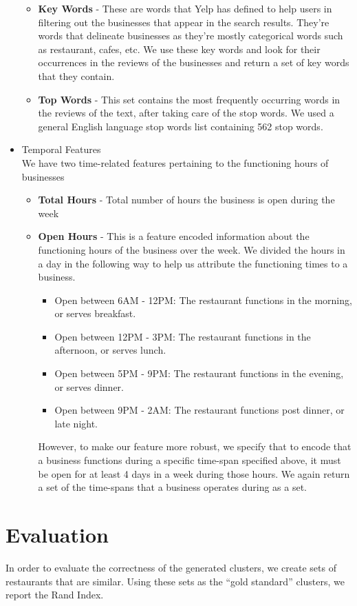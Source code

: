 \documentclass{article}
\begin{document}
\begin{itemize}
\begin{itemize}
            \item \textbf{Key Words} - These are words that Yelp has defined to help users in filtering out the businesses that appear in the search results. They're words that delineate businesses as they're mostly categorical words such as restaurant, cafes, etc. We use these key words and look for their occurrences in the reviews of the businesses and return a set of key words that they contain.
            \item \textbf{Top Words} - This set contains the most frequently occurring words in the reviews of the text, after taking care of the stop words. We used a general English language stop words list containing 562 stop words.
    	\end{itemize}
	\item Temporal Features\\
    We have two time-related features pertaining to the functioning hours of businesses
    \begin{itemize}
    \item \textbf{Total Hours} - Total number of hours the business is open during the week
    \item \textbf{Open Hours} - This is a feature encoded information about the functioning hours of the business over the week. We divided the hours in a day in the following way to help us attribute the functioning times to a business.
    \begin{itemize}
      \item Open between 6AM - 12PM: The restaurant functions in the morning, or serves breakfast.
      \item Open between 12PM - 3PM: The restaurant functions in the afternoon, or serves lunch.
      \item Open between 5PM - 9PM: The restaurant functions in the evening, or serves dinner.
      \item Open between 9PM - 2AM: The restaurant functions post dinner, or late night.
    \end{itemize}
    However, to make our feature more robust, we specify that to encode that a business functions during a specific time-span specified above, it must be open for at least 4 days in a week during those hours. We again return a set of the time-spans that a business operates during as a set.
    
    \end{itemize}
\end{itemize}

\section{Evaluation}
In order to evaluate the correctness of the generated clusters, we create sets of restaurants that are similar. Using these sets as the ``gold standard'' clusters, we report the Rand Index.
\end{document}
